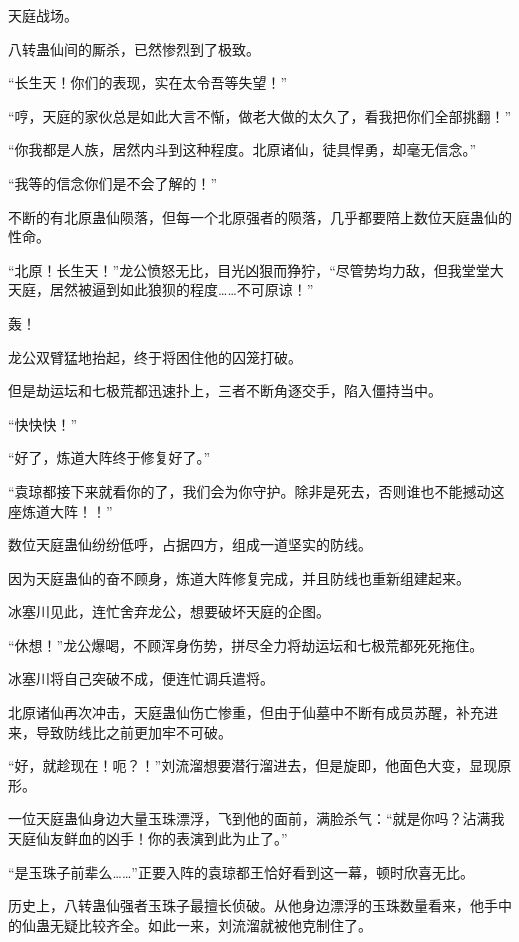 
\begin{this_body}

天庭战场。

八转蛊仙间的厮杀，已然惨烈到了极致。

“长生天！你们的表现，实在太令吾等失望！”

“哼，天庭的家伙总是如此大言不惭，做老大做的太久了，看我把你们全部挑翻！”

“你我都是人族，居然内斗到这种程度。北原诸仙，徒具悍勇，却毫无信念。”

“我等的信念你们是不会了解的！”

不断的有北原蛊仙陨落，但每一个北原强者的陨落，几乎都要陪上数位天庭蛊仙的性命。

“北原！长生天！”龙公愤怒无比，目光凶狠而狰狞，“尽管势均力敌，但我堂堂大天庭，居然被逼到如此狼狈的程度……不可原谅！”

轰！

龙公双臂猛地抬起，终于将困住他的囚笼打破。

但是劫运坛和七极荒都迅速扑上，三者不断角逐交手，陷入僵持当中。

“快快快！”

“好了，炼道大阵终于修复好了。”

“袁琼都接下来就看你的了，我们会为你守护。除非是死去，否则谁也不能撼动这座炼道大阵！！”

数位天庭蛊仙纷纷低呼，占据四方，组成一道坚实的防线。

因为天庭蛊仙的奋不顾身，炼道大阵修复完成，并且防线也重新组建起来。

冰塞川见此，连忙舍弃龙公，想要破坏天庭的企图。

“休想！”龙公爆喝，不顾浑身伤势，拼尽全力将劫运坛和七极荒都死死拖住。

冰塞川将自己突破不成，便连忙调兵遣将。

北原诸仙再次冲击，天庭蛊仙伤亡惨重，但由于仙墓中不断有成员苏醒，补充进来，导致防线比之前更加牢不可破。

“好，就趁现在！呃？！”刘流溜想要潜行溜进去，但是旋即，他面色大变，显现原形。

一位天庭蛊仙身边大量玉珠漂浮，飞到他的面前，满脸杀气：“就是你吗？沾满我天庭仙友鲜血的凶手！你的表演到此为止了。”

“是玉珠子前辈么……”正要入阵的袁琼都王恰好看到这一幕，顿时欣喜无比。

历史上，八转蛊仙强者玉珠子最擅长侦破。从他身边漂浮的玉珠数量看来，他手中的仙蛊无疑比较齐全。如此一来，刘流溜就被他克制住了。


\end{this_body}
